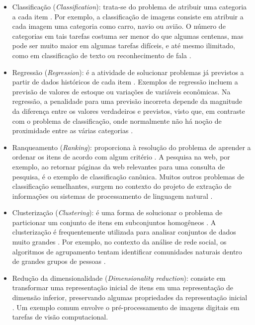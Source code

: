 \documentclass[
	12pt,				%
	oneside,			%
	a4paper,			%
	english,			%
	brazil				%
	]{abntex2ppgsi}
\begin{document}
\begin{itemize}
  \item Classificação (\textit{Classification}): trata-se do problema de atribuir uma categoria a cada item \cite{mohri2018foundations}. Por exemplo, a classificação de imagens consiste em atribuir a cada imagem uma categoria como carro, navio ou avião. O número de categorias em tais tarefas costuma ser menor do que algumas centenas, mas pode ser muito maior em algumas tarefas difíceis, e até mesmo ilimitado, como em classificação de texto ou reconhecimento de fala \cite{mohri2018foundations}.

  \item Regressão (\textit{Regression}): é a atividade de solucionar problemas já previstos a partir de dados históricos de cada item \cite{mohri2018foundations}. Exemplos de regressão incluem a previsão de valores de estoque ou variações de variáveis econômicas. Na regressão, a penalidade para uma previsão incorreta depende da magnitude da diferença entre os valores verdadeiros e previstos, visto que, em contraste com o problema de classificação, onde normalmente não há noção de proximidade entre as várias categorias \cite{mohri2018foundations}.

  \item Ranqueamento (\textit{Ranking}): proporciona à resolução do problema de aprender a ordenar os itens de acordo com algum critério \cite{mohri2018foundations}. A pesquisa na web, por exemplo, ao retornar páginas da web relevantes para uma consulta de pesquisa, é o exemplo de classificação canônica. Muitos outros problemas de classificação semelhantes, surgem no contexto do projeto de extração de informações ou sistemas de processamento de linguagem natural \cite{mohri2018foundations}.

  \item Clusterização (\textit{Clustering}): é uma forma de solucionar o problema de particionar um conjunto de itens em subconjuntos homogêneos \cite{mohri2018foundations}. A clusterização é frequentemente utilizada para analisar conjuntos de dados muito grandes \cite{mohri2018foundations}. Por exemplo, no contexto da análise de rede social, os algoritmos de agrupamento tentam identificar comunidades naturais dentro de grandes grupos de pessoas \cite{mohri2018foundations}.

  \item Redução da dimensionalidade (\textit{Dimensionality reduction}): consiste em transformar uma representação inicial de itens em uma representação de dimensão inferior, preservando algumas propriedades da representação inicial \cite{mohri2018foundations}. Um exemplo comum envolve o pré-processamento de imagens digitais em tarefas de visão computacional.
\end{itemize}
\end{document}

